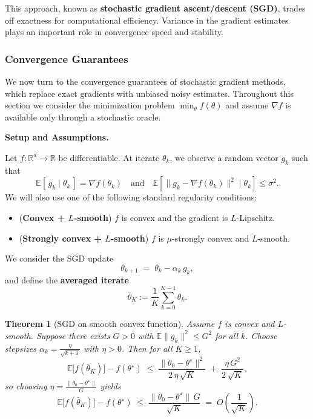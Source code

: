 \documentclass[
]{book}
\providecommand{\tightlist}{%
  \setlength{\itemsep}{0pt}\setlength{\parskip}{0pt}}
\newtheorem{theorem}{Theorem}[chapter]
\theoremstyle{definition}
\theoremstyle{definition}
\theoremstyle{definition}
\theoremstyle{definition}
\theoremstyle{remark}
\begin{document}
This approach, known as \textbf{stochastic gradient ascent/descent (SGD)}, trades off exactness for computational efficiency. Variance in the gradient estimates plays an important role in convergence speed and stability.

\subsubsection{Convergence Guarantees}\label{convergence-guarantees-1}

We now turn to the convergence guarantees of stochastic gradient methods, which replace exact gradients with unbiased noisy estimates. Throughout this section we consider the minimization problem \(\min_\theta f(\theta)\) and assume \(\nabla f\) is available only through a stochastic oracle.

\textbf{Setup and Assumptions.}

Let \(f:\mathbb{R}^d\!\to\!\mathbb{R}\) be differentiable. At iterate \(\theta_k\), we observe a random vector \(g_k\) such that
\[
\mathbb{E}[\,g_k \mid \theta_k\,] = \nabla f(\theta_k)
\quad\text{and}\quad
\mathbb{E}\!\left[\|g_k-\nabla f(\theta_k)\|^2 \mid \theta_k\right] \le \sigma^2.
\]
We will also use one of the following standard regularity conditions:

\begin{itemize}
\tightlist
\item
  (\textbf{Convex + \(L\)-smooth}) \(f\) is convex and the gradient is \(L\)-Lipschitz.\\
\item
  (\textbf{Strongly convex + \(L\)-smooth}) \(f\) is \(\mu\)-strongly convex and \(L\)-smooth.
\end{itemize}

We consider the SGD update
\[
\theta_{k+1} \;=\; \theta_k - \alpha_k\, g_k,
\]
and define the \textbf{averaged iterate}
\[
\bar\theta_K := \frac{1}{K}\sum_{k=0}^{K-1}\theta_k.
\]

\begin{theorem}[SGD on smooth convex function]
\protect\hypertarget{thm:sgd-convex-rate}{}\label{thm:sgd-convex-rate}Assume \(f\) is convex and \(L\)-smooth. Suppose there exists \(G\!>\!0\) with \(\mathbb{E}\|g_k\|^2 \le G^2\) for all \(k\). Choose stepsizes \(\alpha_k = \frac{\eta}{\sqrt{k+1}}\) with \(\eta>0\). Then for all \(K\!\ge\!1\),
\[
\mathbb{E}\big[f(\bar\theta_K)\big] - f(\theta^\star)
\;\le\;
\frac{\|\theta_0-\theta^\star\|^2}{2\,\eta\,\sqrt{K}}
\;+\;
\frac{\eta\,G^2}{2\,\sqrt{K}},
\]
so choosing \(\eta = \frac{\|\theta_0-\theta^\star\|}{G}\) yields
\[
\mathbb{E}\big[f(\bar\theta_K)\big] - f(\theta^\star)
\;\le\;
\frac{\|\theta_0-\theta^\star\|\,G}{\sqrt{K}}
\;=\; O\!\left(\frac{1}{\sqrt{K}}\right).
\]
\end{theorem}
\end{document}
